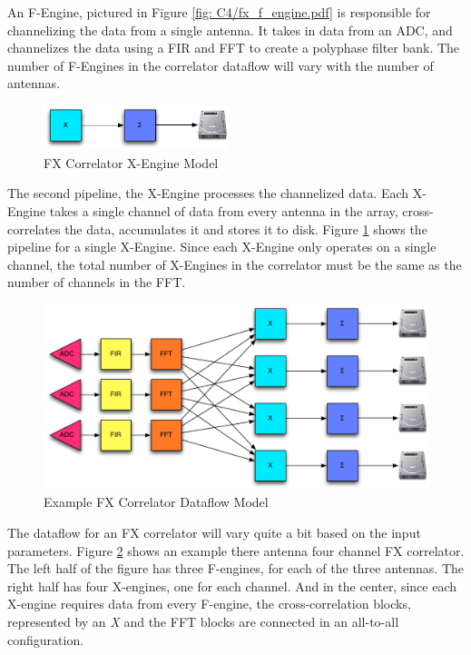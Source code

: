 An F-Engine, pictured in Figure \ref{fig: C4/fx_f_engine.pdf} is responsible for channelizing the data from a single antenna. 
It takes in data from an ADC, and channelizes the data using a FIR and FFT to create a polyphase filter bank. 
The number of F-Engines in the correlator dataflow will vary with the number of antennas.

\begin{figure}[h!]
  \centering
    \includegraphics[width=0.48\textwidth]{Images/C4/fx_x_engine.pdf}
  \caption{FX Correlator X-Engine Model}
  \label{fig: C4/fx_x_engine.pdf}
\end{figure}

The second pipeline, the X-Engine processes the channelized data. 
Each X-Engine takes a single channel of data from every antenna in the array, cross-correlates the data, accumulates it and stores it to disk. 
Figure \ref{fig: C4/fx_x_engine.pdf} shows the pipeline for a single X-Engine. 
Since each X-Engine only operates on a single channel, the total number of X-Engines in the correlator must be the same as the number of channels in the FFT.

\begin{figure}[h!]
  \centering
    \includegraphics[width=1\textwidth]{Images/C4/fx_dataflow.pdf}
  \caption{Example FX Correlator Dataflow Model}
  \label{fig: C4/fx_dataflow.pdf}
\end{figure}

The dataflow for an FX correlator will vary quite a bit based on the input parameters. 
Figure \ref{fig: C4/fx_dataflow.pdf} shows an example there antenna four channel FX correlator. 
The left half of the figure has three F-engines, for each of the three antennas.
The right half has four X-engines, one for each channel.
And in the center, since each X-engine requires data from every F-engine, the cross-correlation blocks, represented by an \emph{X} and the FFT blocks are connected in an all-to-all configuration.




